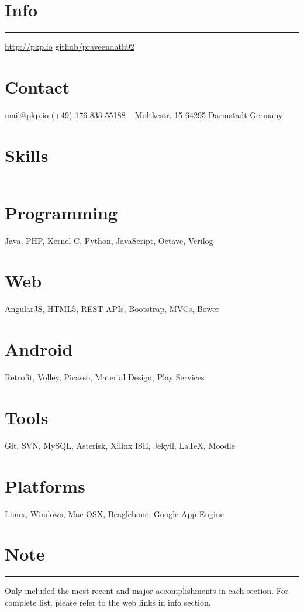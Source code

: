 \documentclass[]{friggeri-cv}
\begin{document}

\begin{aside}
  \section{Info}
    \noindent\rule{3cm}{0.5pt}
    \href{http://pkp.io}{http://pkp.io}
    \href{https://github.com/praveendath92}{github/praveendath92}    
  \section{Contact}
    \href{mailto:mail@pkp.io}{mail@pkp.io}
    (+49) 176-833-55188
    ~
    Moltkestr. 15
    64295 Darmstadt
    Germany
    ~
  \section{Skills}
    \noindent\rule{3cm}{0.5pt}
  \section{Programming}
    Java, PHP, Kernel C, Python, JavaScript, Octave, Verilog
  \section{Web}
    AngularJS, HTML5, REST APIs, Bootstrap, MVCs, Bower
  \section{Android}
    Retrofit, Volley, Picasso, Material Design, Play Services
  \section{Tools}
    Git, SVN, MySQL, Asterisk, Xilinx ISE, Jekyll, \LaTeX, Moodle
  \section{Platforms}
    Linux, Windows, Mac OSX, Beaglebone, Google App Engine
  \section{Note}
    \noindent\rule{3cm}{0.5pt}
    Only included the most recent and major accomplishments in each section. For complete list, please refer to the web links in info section.
\end{aside}
\end{document}
